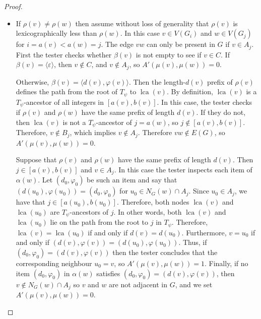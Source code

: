 \documentclass{patmorin}
\DeclareMathOperator{\lca}{lca}
\begin{document}
\begin{proof}
\begin{itemize}
    \item If $\rho(v)\neq\rho(w)$ then assume without loss of generality that $\rho(v)$ is lexicographically less than $\rho(w)$. In this case $v\in V(G_i)$ and $w\in V(G_j)$ for $i=a(v)<a(w)=j$. The edge $vw$ can only be present in $G$ if $v\in A_j$. First the tester checks whether $\beta(v)$ is not empty to see if $v\in C$. If $\beta(v)=\langle\varepsilon\rangle$, then $v\not\in C$, and  $v\not\in A_j$, so $A'(\mu(v),\mu(w))=0$.

          Otherwise, $\beta(v)=\langle d(v),\varphi(v)\rangle$.  Then the length-$d(v)$ prefix of $\rho(v)$ defines the path from the root of $T_\psi$ to $\lca(v)$.  By definition, $\lca(v)$ is a $T_\psi$-ancestor of all integers in $[a(v),b(v)]$. In this case, the tester checks if $\rho(v)$ and $\rho(w)$ have the same prefix of length $d(v)$.  If they do not, then $\lca(v)$ is not a $T_\psi$-ancestor of $j=a(w)$, so $j\not\in[a(v),b(v)]$.  Therefore, $v\not\in B_{j}$, which implies $v\not\in A_j$. Therefore $vw\not\in E(G)$, so $A'(\mu(v),\mu(w))=0$.

          Suppose that $\rho(v)$ and $\rho(w)$ have the same prefix of length $d(v)$.  Then $j\in [a(v),b(v)]$ and $v\in A_j$. In this case the tester inspects each item of $\alpha(w)$. Let $(d_0,\varphi_0)$ be such an item and say that $(d(u_0),\varphi(u_0))=(d_0,\varphi_0)$ for $u_0 \in N_G(w)\cap A_j$. Since $u_0 \in A_j$, we have that $j\in[a(u_0),b(u_0)]$. Therefore, both nodes $\lca(v)$ and $\lca(u_0)$ are $T_\psi$-ancestors of $j$. In other words, both $\lca(v)$ and $\lca(u_0)$ lie on the path from the root to $j$ in $T_{\psi}$. Therefore, $\lca(v)=\lca(u_0)$ if and only if $d(v)=d(u_0)$. Furthermore, $v=u_0$ if and only if $(d(v),\varphi(v))=(d(u_0),\varphi(u_0))$. Thus, if $(d_0,\varphi_0)=(d(v),\varphi(v))$ then the tester concludes that the corresponding neighbour $u_0=v$, so $A'(\mu(v),\mu(w))=1$. Finally, if no item $(d_0,\varphi_0)$ in $\alpha(w)$ satisfies $(d_0,\varphi_0)=(d(v),\varphi(v))$, then $v\not\in N_G(w)\cap A_j$ so $v$ and $w$ are not adjacent in $G$, and we set $A'(\mu(v),\mu(w))=0$.
  \end{itemize}


\end{proof}
\end{document}
